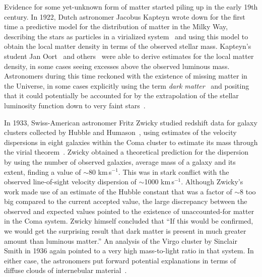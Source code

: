 
Evidence for some yet-unknown form of matter started piling up in the early 19th century. 
In 1922, Dutch astronomer Jacobus Kapteyn wrote down for the first time a predictive model for the distribution of matter in the Milky Way, describing the stars as particles in a virialized system~\cite{1922ApJ....55..302K} and using this model to obtain the local matter density in terms of the observed stellar mass. Kapteyn's student Jan Oort~\cite{1932BAN.....6..249O} and others~\cite{1922MNRAS..82..122J} were able to derive estimates for the local matter density, in some cases seeing excesses above the observed luminous mass. Astronomers during this time reckoned with the existence of missing matter in the Universe, in some cases explicitly using the term \emph{dark matter}~\cite{1922ApJ....55..302K} and positing that it could potentially be accounted for by the extrapolation of the stellar luminosity function down to very faint stars~\cite{1932BAN.....6..249O}.

In 1933, Swiss-American astronomer Fritz Zwicky studied redshift data for galaxy clusters collected by Hubble and Humason~\cite{1931ApJ....74...43H}, using estimates of the velocity dispersions in eight galaxies within the Coma cluster to estimate its mass through the virial theorem~\cite{1933AcHPh...6..110Z}. Zwicky obtained a theoretical prediction for the dispersion by using the number of observed galaxies, average mass of a galaxy and its extent, finding a value of $\sim$80 km\,s$^{-1}$. This was in stark conflict with the observed line-of-sight velocity dispersion of $\sim$1000 km\,s$^{-1}$. Although Zwicky's work made use of an estimate of the Hubble constant that was a factor of $\sim$8 too big compared to the current accepted value, the large discrepancy between the observed and expected values pointed to the existence of unaccounted-for matter in the Coma system. Zwicky himself concluded that ``If this would be confirmed, we would get the surprising result that dark matter is present in much greater amount than luminous matter.'' An analysis of the Virgo cluster by Sinclair Smith in 1936 again pointed to a very high mass-to-light ratio in that system. In either case, the astronomers put forward potential explanations in terms of diffuse clouds of internebular material~\cite{1937ApJ....86..217Z}.

